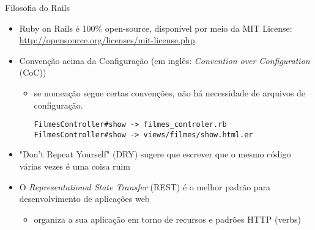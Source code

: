 \begin{frame}{Filosofia do Rails}
  \begin{itemize}
    \item Ruby on Rails é 100\% open-source, disponível por meio da MIT License:
      \url{http://opensource.org/licenses/mit-license.php}.  
    \item \alert{Convenção} acima da Configuração (em inglês: \textit{Convention over Configuration} (CoC))
    \begin{itemize}
	\item se nomeação segue certas convenções, não há necessidade de arquivos de configuração.
	  \begin{verbatim}
FilmesController#show -> filmes_controler.rb 
FilmesController#show -> views/filmes/show.html.er
    \end{verbatim}
    \end{itemize}
    \item \alert{"Don't Repeat Yourself"} (DRY) sugere que escrever que o mesmo código várias 
      vezes é uma coisa ruim
    
    \item O \textit{Representational State Transfer} (REST) é o melhor padrão para desenvolvimento de aplicações web
    \begin{itemize}
     \item organiza a sua aplicação em torno de \alert{recursos} e \alert{padrões} HTTP (verbs)
    \end{itemize}
  \end{itemize}   
\end{frame}
